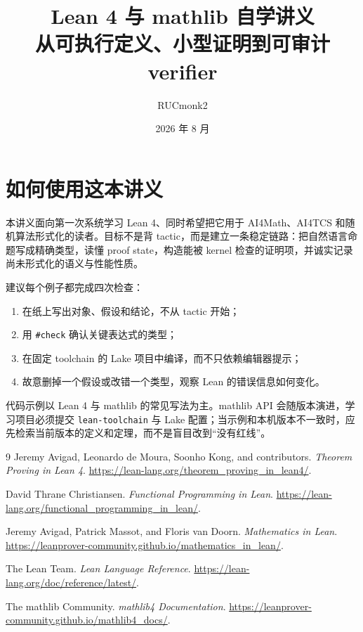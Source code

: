 \documentclass[UTF8,zihao=-4,oneside,fontset=fandol]{ctexrep}
\title{\heiti Lean 4 与 mathlib 自学讲义\\[0.5em]
\Large 从可执行定义、小型证明到可审计 verifier}
\author{RUCmonk2}
\date{2026 年 8 月}
\theoremstyle{remark}
\newcommand{\code}[1]{\texttt{#1}}
\begin{document}
\hypersetup{pageanchor=false}
\maketitle
\hypersetup{pageanchor=true}

\chapter*{如何使用这本讲义}

本讲义面向第一次系统学习 Lean 4、同时希望把它用于 AI4Math、AI4TCS 和随机算法形式化的读者。目标不是背 tactic，而是建立一条稳定链路：把自然语言命题写成精确类型，读懂 proof state，构造能被 kernel 检查的证明项，并诚实记录尚未形式化的语义与性能性质。

建议每个例子都完成四次检查：
\begin{enumerate}
  \item 在纸上写出对象、假设和结论，不从 tactic 开始；
  \item 用 \code{\#check} 确认关键表达式的类型；
  \item 在固定 toolchain 的 Lake 项目中编译，而不只依赖编辑器提示；
  \item 故意删掉一个假设或改错一个类型，观察 Lean 的错误信息如何变化。
\end{enumerate}

代码示例以 Lean 4 与 mathlib 的常见写法为主。mathlib API 会随版本演进，学习项目必须提交 \code{lean-toolchain} 与 Lake 配置；当示例和本机版本不一致时，应先检索当前版本的定义和定理，而不是盲目改到“没有红线”。

\tableofcontents
\clearpage











\begin{thebibliography}{9}
Jeremy Avigad, Leonardo de Moura, Soonho Kong, and contributors.
\newblock \emph{Theorem Proving in Lean 4}.
\newblock \url{https://lean-lang.org/theorem_proving_in_lean4/}.

David Thrane Christiansen.
\newblock \emph{Functional Programming in Lean}.
\newblock \url{https://lean-lang.org/functional_programming_in_lean/}.

Jeremy Avigad, Patrick Massot, and Floris van Doorn.
\newblock \emph{Mathematics in Lean}.
\newblock \url{https://leanprover-community.github.io/mathematics_in_lean/}.

The Lean Team.
\newblock \emph{Lean Language Reference}.
\newblock \url{https://lean-lang.org/doc/reference/latest/}.

The mathlib Community.
\newblock \emph{mathlib4 Documentation}.
\newblock \url{https://leanprover-community.github.io/mathlib4_docs/}.
\end{thebibliography}
\end{document}
